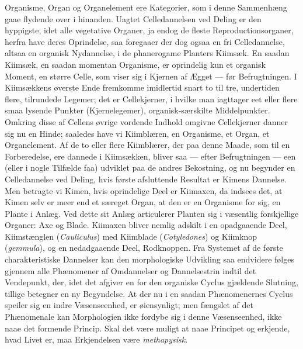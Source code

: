 \documentclass[12pt,a4paper]{book}
\begin{document}
Organisme, Organ og Organelement ere Kategorier, som i denne
Sammenhæng gaae flydende over i hinanden. Uagtet
Celledannelsen ved Deling er den hyppigste, idet alle vegetative
Organer, ja endog de fleste Reproductionsorganer, herfra have deres
Oprindelse, saa foregaaer der dog ogsaa en fri Celledannelse,
altsaa en organisk Nydannelse, i de phanerogame Planters Kiimsæk.
En saadan Kiimsæk, en saadan momentan Organisme, er oprindelig kun
et organisk Moment, en større Celle, som viser sig i Kjernen af
Ægget --- før Befrugtningen. I Kiimsækkens øverste Ende fremkomme
imidlertid snart to til tre, undertiden flere, tilrundede Legemer;
det er Cellekjerner, i hvilke man iagttager eet eller flere smaa
lysende Punkter (Kjernelegemer), organisk-særskilte Middelpunkter.
Omkring disse af Cellens øvrige vordende Indhold omgivne
Cellekjerner danner sig nu en Hinde; saaledes have vi Kiimblæren,
en Organisme, et Organ, et Organelement. Af de to eller flere
Kiimblærer, der paa denne Maade, som til en Forberedelse, ere
dannede i Kiimsækken, bliver saa --- efter Befrugtningen --- een
(eller i nogle Tilfælde faa) udviklet paa de andres Bekostning, og
nu begynder en Celledannelse ved Deling, hvis første afsluttende
Resultat er Kimens Dannelse. Men betragte vi Kimen, hvis
oprindelige Deel er Kiimaxen, da indsees det, at Kimen selv er meer
end et særeget Organ, at den er en Organisme for sig, en Plante i
Anlæg. Ved dette sit Anlæg articulerer Planten sig i væsentlig
forskjellige Organer: Axe og Blade. Kiimaxen bliver nemlig adskilt
i en opadgaaende Deel, Kiimstænglen (\textit{Cauliculus}) med Kiimblade
(\textit{Cotyledones}) og Kiimknop (\textit{gemmula}), og en nedadgaaende
Deel, Rodknoppen. Fra Systemet af de første charakteristiske Dannelser
kan den morphologiske Udvikling saa endvidere følges gjennem alle
Phænomener af Omdannelser og Dannelsestrin indtil det Vendepunkt,
der, idet det afgiver en for den organiske Cyclus gjældende
Slutning, tillige betegner en ny Begyndelse. At der nu i en saadan
Phænomenernes Cyclus speiler sig en indre Væsenseenhed, er
øiensynligt; men fængslet af det Phænomenale kan Morphologien ikke
fordybe sig i denne Væsenseenhed, ikke naae det formende Princip.
Skal det være muligt at naae Principet og erkjende, hvad Livet er,
maa Erkjendelsen være \emph{methapysisk}.
\end{document}

